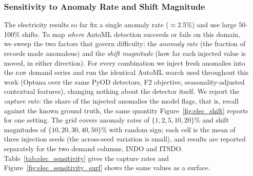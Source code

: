 \documentclass[12pt]{article}
\begin{document}
\subsubsection{Sensitivity to Anomaly Rate and Shift Magnitude}
\label{sec:elec_sensitivity}

The electricity results so far fix a single anomaly rate ($\approx$2.5\%) and use large 50--100\% shifts. To map \emph{where} AutoML detection succeeds or fails on this domain, we sweep the two factors that govern difficulty: the \emph{anomaly rate} (the fraction of records made anomalous) and the \emph{shift magnitude} (how far each injected value is moved, in either direction). For every combination we inject fresh anomalies into the raw demand series and run the identical AutoML search used throughout this work (Optuna over the same PyOD detectors, F2 objective, seasonality-adjusted contextual features), changing nothing about the detector itself. We report the \emph{capture rate}: the share of the injected anomalies the model flags, that is, recall against the known ground truth, the same quantity Figure~\ref{fig:elec_shift} reports for one setting. The grid covers anomaly rates of $\{1, 2, 5, 10, 20\}\%$ and shift magnitudes of $\{10, 20, 30, 40, 50\}\%$ with random sign; each cell is the mean of three injection seeds (the across-seed variation is small), and results are reported separately for the two demand columns, INDO and ITSDO. Table~\ref{tab:elec_sensitivity} gives the capture rates and Figure~\ref{fig:elec_sensitivity_surf} shows the same values as a surface.
\end{document}
